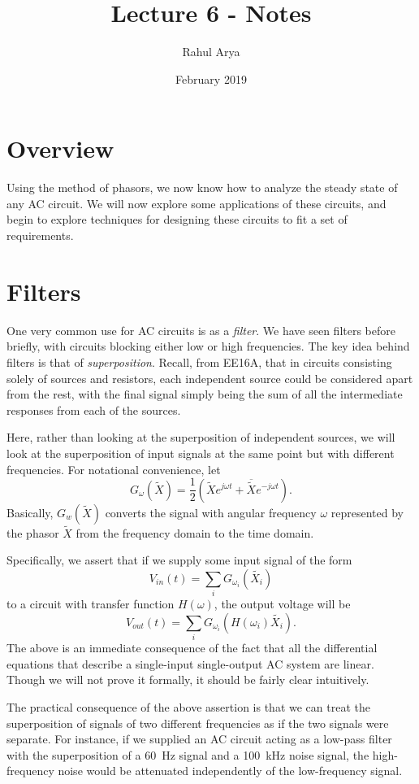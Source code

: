 \documentclass[letterpaper]{article}
\title{Lecture 6 - Notes}
\author{Rahul Arya}
\date{February 2019}
\theoremstyle{remark}
\renewcommand{\tilde}[1]{\widetilde{#1}}
\begin{document}
\maketitle

\section{Overview}
Using the method of phasors, we now know how to analyze the steady state of any AC circuit. We will now explore some applications of these circuits, and begin to explore techniques for designing these circuits to fit a set of requirements.

\section{Filters}
One very common use for AC circuits is as a \emph{filter}. We have seen filters before briefly, with circuits blocking either low or high frequencies. The key idea behind filters is that of \emph{superposition}. Recall, from EE16A, that in circuits consisting solely of sources and resistors, each independent source could be considered apart from the rest, with the final signal simply being the sum of all the intermediate responses from each of the sources.

Here, rather than looking at the superposition of independent sources, we will look at the superposition of input signals at the same point but with different frequencies. For notational convenience, let
\[
    G_\omega(\tilde{X}) = \frac{1}{2} \left(\tilde{X}e^{j\omega t} + \overline{\tilde{X}} e^{-j\omega t} \right).
\]
Basically, $G_w(\tilde{X})$ converts the signal with angular frequency $\omega$ represented by the phasor $\tilde{X}$ from the frequency domain to the time domain.

Specifically, we assert that if we supply some input signal of the form
\[
    V_{in}(t) = \sum_i G_{\omega_i}(\tilde{X_i})
\]
to a circuit with transfer function $H(\omega)$, the output voltage will be
\[
    V_{out}(t) = \sum_i G_{\omega_i}(H(\omega_i)\tilde{X_i}).
\]
The above is an immediate consequence of the fact that all the differential equations that describe a single-input single-output AC system are linear. Though we will not prove it formally, it should be fairly clear intuitively.

The practical consequence of the above assertion is that we can treat the superposition of signals of two different frequencies as if the two signals were separate. For instance, if we supplied an AC circuit acting as a low-pass filter with the superposition of a \SI{60}{\hertz} signal and a \SI{100}{\kilo\hertz} noise signal, the high-frequency noise would be attenuated independently of the low-frequency signal.
\end{document}
